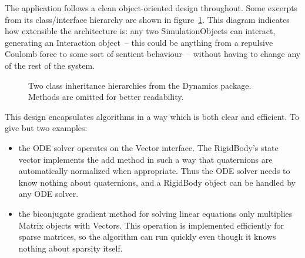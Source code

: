 The application follows a clean object-oriented design throughout. Some excerpts from its
class/interface hierarchy are shown in figure~\ref{classHierarchy}. This diagram indicates how
extensible the architecture is: any two \textsf{SimulationObject}s can interact, generating an
\textsf{Interaction} object~-- this could be anything from a repulsive Coulomb force to some
sort of sentient behaviour~-- without having to change any of the rest of the system.

\begin{figure}
\centerline{}
\caption{Two class inheritance hierarchies from the Dynamics package. Methods are omitted for
    better readability.\label{classHierarchy}}
\end{figure}

This design encapsulates algorithms in a way which is both clear and efficient. To give but two
examples:
\begin{itemize}
\item the ODE solver operates on the \textsf{Vector} interface. The \textsf{RigidBody}'s
    state vector implements the \textsf{add} method in such a way that quaternions are
    automatically normalized when appropriate. Thus the ODE solver needs to know nothing about
    quaternions, and a \textsf{RigidBody} object can be handled by any ODE solver.
\item the biconjugate gradient method for solving linear equations only multiplies \textsf{Matrix}
    objects with \textsf{Vector}s. This operation is implemented efficiently for sparse matrices,
    so the algorithm can run quickly even though it knows nothing about sparsity itself.
\end{itemize}


